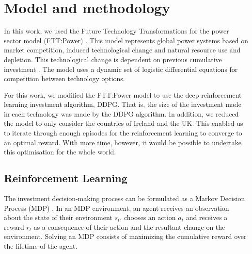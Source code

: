 

\section{Model and methodology}
\label{sec:methods}


In this work, we used the Future Technology Transformations for the power sector model (FTT:Power) \cite{Mercure2012}. This model represents global power systems based on market competition, induced technological change and natural resource use and depletion. This technological change is dependent on previous cumulative investment \cite{Mercure2012}. The model uses a dynamic set of logistic differential equations for competition between technology options.

For this work, we modified the FTT:Power model to use the deep reinforcement learning investment algorithm, DDPG. That is, the size of the investment made in each technology was made by the DDPG algorithm. In addition, we reduced the model to only consider the countries of Ireland and the UK. This enabled us to iterate through enough episodes for the reinforcement learning to converge to an optimal reward. With more time, however, it would be possible to undertake this optimisation for the whole world.

\subsection*{Reinforcement Learning}

The investment decision-making process can be formulated as a Markov Decision Process (MDP) \cite{puterman2014markov}. In an MDP environment, an agent receives an observation about the state of their environment $s_t$, chooses an action $a_t$ and receives a reward $r_t$ as a consequence of their action and the resultant change on the environment. Solving an MDP consists of maximizing the cumulative reward over the lifetime of the agent. 


